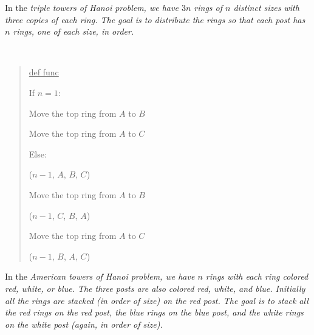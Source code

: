 \documentclass[10pt]{article}
\begin{document}
In the \it{triple towers of Hanoi} problem, we have \( 3n \) rings of \( n \) distinct sizes with three copies of each ring. The goal is to distribute the rings so that each post has \( n \) rings, one of each size, in order.

\begin{solution}\ %
\begin{quote}
\noindent\ul{def func }%

%

\begin{steps}
  \item If \( n = 1 \):
    \begin{steps}
    \item Move the top ring from \( A \) to \( B \)
    \item Move the top ring from \( A \) to \( C \)
    \end{steps}
  \item Else:
    \begin{steps}
    \item {}(\( n-1 \), \( A \), \( B \), \( C \)) 
    \item Move the top ring from \( A \) to \( B \)
    \item {}(\( n-1 \), \( C \), \( B \), \( A \)) 
    \item Move the top ring from \( A \) to \( C \)
    \item {}(\( n-1 \), \( B \), \( A \), \( C \)) 
    \end{steps}
\end{steps}

\end{quote}
\end{solution}
\pagebreak

In the \it{American towers of Hanoi} problem, we have \( n \) rings with each ring colored red, white, or blue. The three posts are also colored red, white, and blue. Initially all the rings are stacked (in order of size) on the red post. The goal is to stack all the red rings on the red post, the blue rings on the blue post, and the white rings on the white post (again, in order of size).
\end{document}
